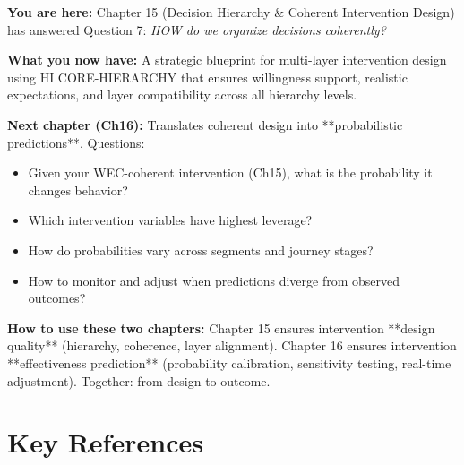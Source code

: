 \documentclass[11pt, a4paper]{article}
\begin{document}
\begin{tcolorbox}[colback=green!10!white, colframe=green!75!black, title=Reading Path: To Chapter 16 (Probability of Behavioral Change)]

\textbf{You are here:} Chapter 15 (Decision Hierarchy \& Coherent Intervention Design) has answered Question 7: \textit{HOW do we organize decisions coherently?}

\textbf{What you now have:} A strategic blueprint for multi-layer intervention design using HI CORE-HIERARCHY that ensures willingness support, realistic expectations, and layer compatibility across all hierarchy levels.

\textbf{Next chapter (Ch16):} Translates coherent design into **probabilistic predictions**. Questions:
\begin{itemize}[nosep]
    \item Given your WEC-coherent intervention (Ch15), what is the probability it changes behavior?
    \item Which intervention variables have highest leverage?
    \item How do probabilities vary across segments and journey stages?
    \item How to monitor and adjust when predictions diverge from observed outcomes?
\end{itemize}

\textbf{How to use these two chapters:} Chapter 15 ensures intervention **design quality** (hierarchy, coherence, layer alignment). Chapter 16 ensures intervention **effectiveness prediction** (probability calibration, sensitivity testing, real-time adjustment). Together: from design to outcome.

\end{tcolorbox}


\section*{Key References}
\end{document}
